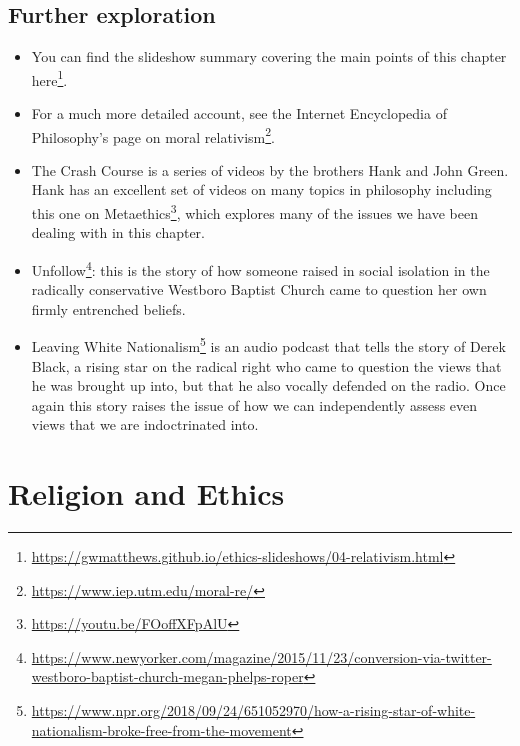 \documentclass[12pt, openany]{book}
\renewcommand{\href}[2]{#2\footnote{\url{#1}}}
\begin{document}
\hypertarget{further-exploration-2}{%
\section*{Further exploration}\label{further-exploration-2}}


\begin{itemize}
\item
  You can find the slideshow summary covering the main points of this chapter \href{https://gwmatthews.github.io/ethics-slideshows/04-relativism.html}{here}.
\item
  For a much more detailed account, see the Internet Encyclopedia of Philosophy's page on \href{https://www.iep.utm.edu/moral-re/}{moral relativism}.
\item
  The Crash Course is a series of videos by the brothers Hank and John Green. Hank has an excellent set of videos on many topics in philosophy including this one on \href{https://youtu.be/FOoffXFpAlU}{Metaethics}, which explores many of the issues we have been dealing with in this chapter.
\item
  \href{https://www.newyorker.com/magazine/2015/11/23/conversion-via-twitter-westboro-baptist-church-megan-phelps-roper}{Unfollow}: this is the story of how someone raised in social isolation in the radically conservative Westboro Baptist Church came to question her own firmly entrenched beliefs.
\item
  \href{https://www.npr.org/2018/09/24/651052970/how-a-rising-star-of-white-nationalism-broke-free-from-the-movement}{Leaving White Nationalism} is an audio podcast that tells the story of Derek Black, a rising star on the radical right who came to question the views that he was brought up into, but that he also vocally defended on the radio. Once again this story raises the issue of how we can independently assess even views that we are indoctrinated into.
\end{itemize}

\hypertarget{religion}{%
\chapter{Religion and Ethics}\label{religion}}
\end{document}
